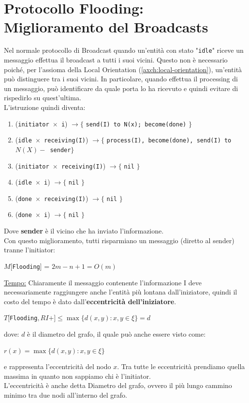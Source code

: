\section{Protocollo Flooding: Miglioramento del Broadcasts}
Nel normale protocollo di Broadcast quando un'entità con stato "\texttt{idle}"
riceve un messaggio effettua il broadcast a tutti i suoi vicini. Questo non è
necessario poiché, per l'assioma della Local Orientation
(\ref{axch:local-orientation}), un'entità può distinguere tra i suoi vicini. In
particolare, quando effettua il processing di un messaggio, può identificare da
quale porta lo ha ricevuto e quindi evitare di rispedirlo su quest'ultima.\\
L'istruzione quindi diventa:

\begin{enumerate}
    \item (\texttt{initiator $\times$ i}) $\rightarrow \lbrace$ \texttt{send(I) to N(x);
              become(done)} $\rbrace$
    \item (\texttt{idle $\times$ receiving(I)}) $\rightarrow \lbrace$ \texttt{process(I),
              become(done), send(I) to $N(X) -$ {sender}}$\rbrace$
    \item (\texttt{initiator $\times$ receiving(I)}) $\rightarrow \lbrace$ \texttt{nil}
          $\rbrace$
    \item (\texttt{idle $\times$ i}) $\rightarrow \lbrace$ \texttt{nil} $\rbrace$
    \item (\texttt{done $\times$ receiving(I)}) $\rightarrow \lbrace$ \texttt{nil}
          $\rbrace$
    \item (\texttt{done $\times$ i}) $\rightarrow \lbrace$ \texttt{nil} $\rbrace$
\end{enumerate}
Dove \textbf{sender} è il vicino che ha inviato l'informazione.\\
Con questo miglioramento, tutti risparmiano un messaggio (diretto al sender)
tranne l'initiator:
\begin{center}
    $M[$\texttt{Flooding}] = $2m-n+1=O(m)$
\end{center}

\underline{Tempo:}
Chiaramente il messaggio contenente l'informazione I deve necessariamente
raggiungere anche l'entità più lontana dall'iniziatore, quindi il costo del
tempo è dato dall'\textbf{eccentricità dell'iniziatore}.
\begin{center}
    $T[$\texttt{Flooding}$, RI+] \leq \max \lbrace d(x,y) : x, y \in \xi \rbrace =
        d$
\end{center}
dove: $d$ è il diametro del grafo, il quale può anche essere visto come:
\begin{center}
    $r(x) = \max \lbrace d(x, y) : x, y \in \xi \rbrace$
\end{center}
e rappresenta l'eccentricità del nodo $x$. Tra tutte le eccentricità prendiamo
quella massima in quanto non sappiamo chi è l'initiator.\\
L'eccentricità è anche detta Diametro del grafo, ovvero il più lungo cammino
minimo tra due nodi all'interno del grafo.

